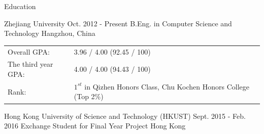 \documentclass{resume} %
\begin{document}
\pagestyle{fancy}
\renewcommand{\headrulewidth}{0pt} 
\renewcommand{\footrulewidth}{0pt}



\begin{rSection}{Education}

\begin{rAwards}
	{Zhejiang University}
	{Oct. 2012 - Present}
	{B.Eng. in Computer Science and Technology} 
	{Hangzhou, China}
\end{rAwards}
{\contentSize
\begin{tabular}{ll}
	Overall GPA: & 3.96 / 4.00 (92.45 / 100)\\   %
	The third year GPA: & 4.00 / 4.00 (94.43 / 100) \\ %
	Rank: & $1^{st}$ in Qizhen Honors Class, Chu Kochen Honors College (Top 2\%)
\end{tabular}
}

\begin{rAwards}
	{Hong Kong University of Science and Technology (HKUST)}
	{Sept. 2015 - Feb. 2016}
	{Exchange Student for Final Year Project} 
	{Hong Kong}
\end{rAwards}


\end{rSection}



\end{document}
